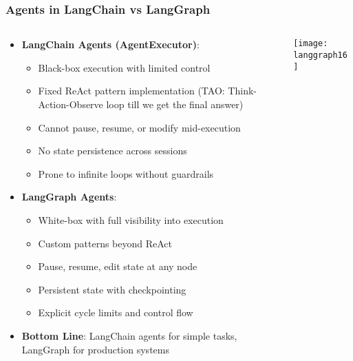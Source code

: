 \begin{frame}[fragile]\frametitle{Agents in LangChain vs LangGraph}

\begin{columns}
    \begin{column}[T]{0.6\linewidth}
      \begin{itemize}
        \item \textbf{LangChain Agents (AgentExecutor)}:
        \begin{itemize}
            \item Black-box execution with limited control
            \item Fixed ReAct pattern implementation (TAO: Think-Action-Observe loop till we get the final answer)
            \item Cannot pause, resume, or modify mid-execution
            \item No state persistence across sessions
            \item Prone to infinite loops without guardrails
        \end{itemize}
        \item \textbf{LangGraph Agents}:
        \begin{itemize}
            \item White-box with full visibility into execution
            \item Custom patterns beyond ReAct
            \item Pause, resume, edit state at any node
            \item Persistent state with checkpointing
            \item Explicit cycle limits and control flow
        \end{itemize}
        \item \textbf{Bottom Line}: LangChain agents for simple tasks, LangGraph for production systems
      \end{itemize}

    \end{column}
    \begin{column}[T]{0.4\linewidth}
\begin{center}
\texttt{[image: langgraph16]}
\end{center}
    \end{column}
  \end{columns}
  
  

\end{frame}

